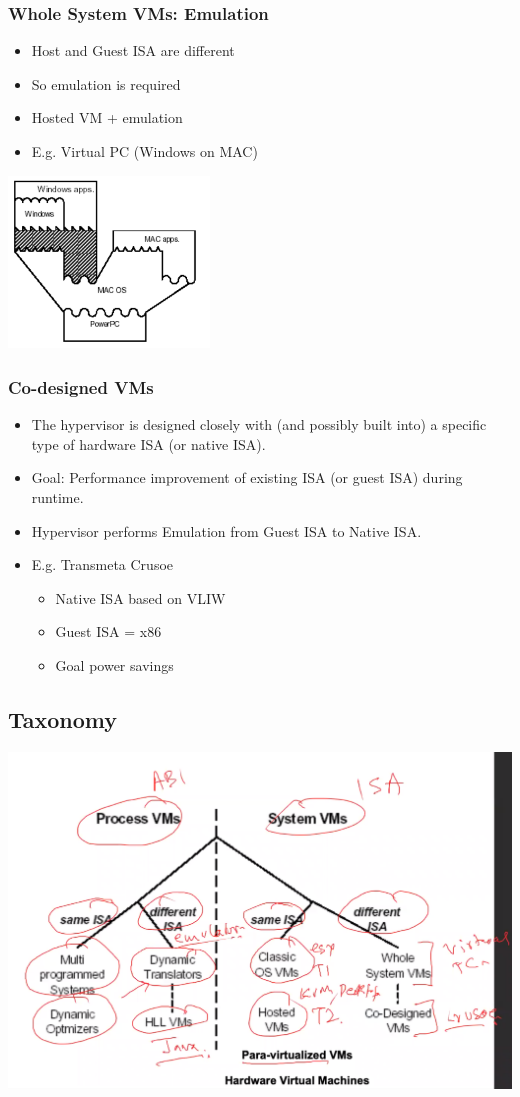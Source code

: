 \documentclass[12pt]{article}
\begin{document}
\subsubsection{Whole System VMs: Emulation}
\begin{itemize}
    \item Host and Guest ISA are different
    \item So emulation is required
    \item Hosted VM + emulation 
    \item E.g. Virtual PC (Windows on MAC)
\end{itemize}
\includegraphics[width=0.4\textwidth]{WholeSystemVMs.png}
\subsubsection{Co-designed VMs}
\begin{itemize}
    \item The hypervisor is designed closely with (and possibly built into) a specific type of hardware ISA (or native ISA).
    \item Goal: Performance improvement of existing ISA (or guest ISA) during runtime.
    \item Hypervisor performs Emulation from Guest ISA to Native ISA.
    \item E.g. Transmeta Crusoe \begin{itemize}
        \item Native ISA based on VLIW
        \item Guest ISA = x86
        \item Goal power savings
    \end{itemize}
\end{itemize}
\subsection{Taxonomy}
\includegraphics[width=\textwidth]{Taxonomy.png}
\end{document}
